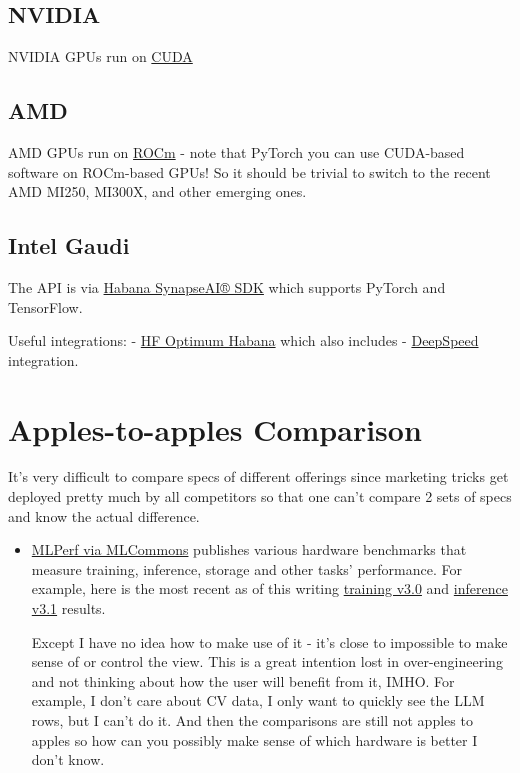 \documentclass[
]{report}
\begin{document}
\subsection{NVIDIA}\label{nvidia-1}

NVIDIA GPUs run on
\href{https://developer.nvidia.com/cuda-toolkit}{CUDA}

\subsection{AMD}\label{amd-1}

AMD GPUs run on
\href{https://www.amd.com/en/products/software/rocm.html}{ROCm} - note
that PyTorch you can use CUDA-based software on ROCm-based GPUs! So it
should be trivial to switch to the recent AMD MI250, MI300X, and other
emerging ones.

\subsection{Intel Gaudi}\label{intel-gaudi}

The API is via \href{https://habana.ai/training-software/}{Habana
SynapseAI® SDK} which supports PyTorch and TensorFlow.

Useful integrations: -
\href{https://github.com/huggingface/optimum-habana}{HF Optimum Habana}
which also includes -
\href{https://github.com/microsoft/DeepSpeed}{DeepSpeed} integration.

\section{Apples-to-apples Comparison}\label{apples-to-apples-comparison}

It's very difficult to compare specs of different offerings since
marketing tricks get deployed pretty much by all competitors so that one
can't compare 2 sets of specs and know the actual difference.

\begin{itemize}
\item
  \href{https://mlcommons.org/en/}{MLPerf via MLCommons} publishes
  various hardware benchmarks that measure training, inference, storage
  and other tasks' performance. For example, here is the most recent as
  of this writing
  \href{https://mlcommons.org/en/training-normal-30/}{training v3.0} and
  \href{https://mlcommons.org/en/inference-datacenter-31/}{inference
  v3.1} results.

  Except I have no idea how to make use of it - it's close to impossible
  to make sense of or control the view. This is a great intention lost
  in over-engineering and not thinking about how the user will benefit
  from it, IMHO. For example, I don't care about CV data, I only want to
  quickly see the LLM rows, but I can't do it. And then the comparisons
  are still not apples to apples so how can you possibly make sense of
  which hardware is better I don't know.
\end{itemize}
\end{document}
